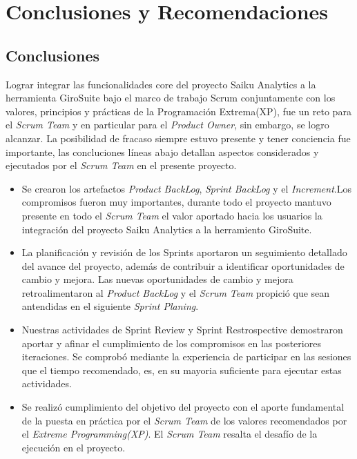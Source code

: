 \chapter{Conclusiones y Recomendaciones} \label{chapter:IV}
\begin{spacing}{1.5}
\section{Conclusiones}
Lograr integrar las funcionalidades core del proyecto Saiku Analytics a la herramienta GiroSuite bajo el marco de trabajo Scrum conjuntamente con los valores, principios y pr\'{a}cticas de la Programaci\'{o}n Extrema(XP), fue un reto para el \textit{Scrum Team} y en particular para el \textit{Product Owner}, sin embargo, se logro alcanzar. La posibilidad de fracaso siempre estuvo presente y tener conciencia fue importante, las concluciones l\'{i}neas abajo detallan aspectos considerados y ejecutados por el \textit{Scrum Team} en el presente proyecto.
\begin{itemize}
	
	\item Se crearon los artefactos \textit{Product BackLog}, \textit{Sprint BackLog} y el \textit{Increment}.Los compromisos fueron muy importantes, durante todo el proyecto mantuvo presente en todo el \textit{Scrum Team} el valor aportado hacia los usuarios la integraci\'{o}n del proyecto Saiku Analytics a la herramiento GiroSuite.
	
	\item La planificaci\'{o}n y revisi\'{o}n de los Sprints aportaron un seguimiento detallado del avance del proyecto, adem\'{a}s de contribuir a identificar oportunidades de cambio y mejora. Las nuevas oportunidades de cambio y mejora retroalimentaron al \textit{Product BackLog} y el \textit{Scrum Team} propici\'{o} que sean antendidas en el siguiente \textit{Sprint Planing}.
	
	\item Nuestras actividades de Sprint Review y Sprint Restrospective demostraron aportar y afinar el cumplimiento de los compromisos en las posteriores iteraciones. Se comprob\'{o} mediante la experiencia de participar en las sesiones que el tiempo recomendado, es, en su mayoria suficiente para ejecutar estas actividades.
	
	\item Se realiz\'{o} cumplimiento del objetivo del proyecto con el aporte fundamental de la puesta en pr\'{a}ctica por el \textit{Scrum Team} de los valores recomendados por el \textit{Extreme Programming(XP)}. El \textit{Scrum Team} resalta el desaf\'{i}o de la ejecuci\'{o}n en el proyecto.
	

\end{itemize}
\end{spacing}
